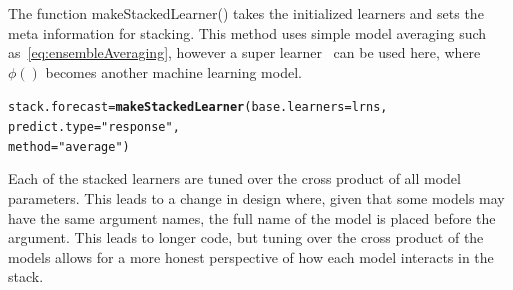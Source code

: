 \documentclass{article}\usepackage[]{graphicx}\usepackage[]{color}
\makeatletter
\newcommand{\hlstr}[1]{\textcolor[rgb]{0.192,0.494,0.8}{#1}}%
\newcommand{\hlstd}[1]{\textcolor[rgb]{0.345,0.345,0.345}{#1}}%
\newcommand{\hlkwb}[1]{\textcolor[rgb]{0.69,0.353,0.396}{#1}}%
\newcommand{\hlkwc}[1]{\textcolor[rgb]{0.333,0.667,0.333}{#1}}%
\newcommand{\hlkwd}[1]{\textcolor[rgb]{0.737,0.353,0.396}{\textbf{#1}}}%
\newenvironment{kframe}{%
 \def\at@end@of@kframe{}%
 \ifinner\ifhmode%
  \def\at@end@of@kframe{\end{minipage}}%
  \begin{minipage}{\columnwidth}%
 \fi\fi%
 \def\FrameCommand##1{\hskip\@totalleftmargin \hskip-\fboxsep
 \colorbox{shadecolor}{##1}\hskip-\fboxsep
     \hskip-\linewidth \hskip-\@totalleftmargin \hskip\columnwidth}%
 \MakeFramed {\advance\hsize-\width
   \@totalleftmargin\z@ \linewidth\hsize
   \@setminipage}}%
 {\par\unskip\endMakeFramed%
 \at@end@of@kframe}
\newenvironment{knitrout}{}{} %
\theoremstyle{definition}
\newcommand\code{\@codex}
\def\@codex#1{{\normalfont\ttfamily\hyphenchar\font=-1 #1}}
\makeatother
\begin{document}
The function \code{makeStackedLearner()} takes the initialized learners and sets the meta information for stacking. This method uses simple model averaging such as~\ref{eq:ensembleAveraging}, however a super learner~\cite{Wolpert92stackedgeneralization} can be used here, where $\phi()$ becomes another machine learning model.

\begin{knitrout}
\color{fgcolor}\begin{kframe}
\begin{alltt}
\hlstd{stack.forecast} \hlkwb{=} \hlkwd{makeStackedLearner}\hlstd{(}\hlkwc{base.learners} \hlstd{= lrns,}
                       \hlkwc{predict.type} \hlstd{=} \hlstr{"response"}\hlstd{,}
                       \hlkwc{method} \hlstd{=} \hlstr{"average"}\hlstd{)}
\end{alltt}
\end{kframe}
\end{knitrout}


Each of the stacked learners are tuned over the cross product of all model parameters. This leads to a change in design where, given that some models may have the same argument names, the full name of the model is placed before the argument. This leads to longer code, but tuning over the cross product of the models allows for a more honest perspective of how each model interacts in the stack.
\end{document}
